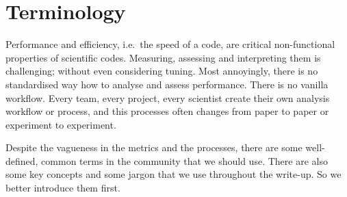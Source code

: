 \chapter{Terminology}
\label{chapter:terminology}

Performance and efficiency, i.e.~the speed of a code, are critical non-functional properties of scientific codes.
Measuring, assessing and interpreting them is challenging; without even considering tuning.
Most annoyingly, there is no standardised way how to analyse
and assess performance.
There is no vanilla workflow.
Every team, every project, every scientist create their own analysis workflow or
process, and this processes often changes from paper to paper or experiment to experiment.

Despite the vagueness in the metrics and the processes, there are some
well-defined, common terms in the community that we should use.
There are also some key concepts and some jargon that we use throughout the
write-up.
So we better introduce them first.


